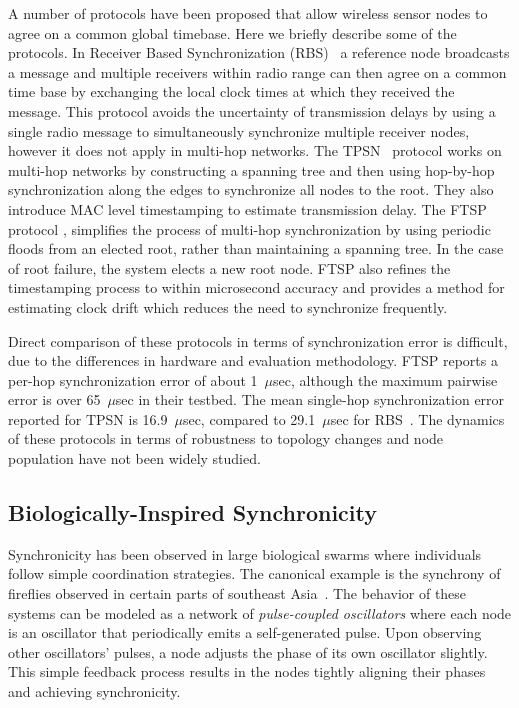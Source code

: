 
A number of protocols have been proposed that allow wireless sensor
nodes to agree on a common global timebase. Here we briefly describe
some of the protocols. In Receiver Based Synchronization
(RBS)~\cite{rbs} a reference node broadcasts a message and multiple
receivers within radio range can then agree on a common time base by
exchanging the local clock times at which they received the message.
This protocol avoids the uncertainty of transmission delays by using a
single radio message to simultaneously synchronize multiple receiver
nodes, however it does not apply in multi-hop networks. The
TPSN~\cite{tpsn} protocol works on multi-hop networks by constructing
a spanning tree and then using hop-by-hop synchronization along the
edges to synchronize all nodes to the root. They also introduce MAC
level timestamping to estimate transmission delay. The FTSP
protocol \cite{ftsp}, simplifies the process of multi-hop
synchronization by using periodic floods from an elected root, rather
than maintaining a spanning tree. In the case of root failure, the
system elects a new root node. FTSP also refines the timestamping
process to within microsecond accuracy and provides a method for
estimating clock drift which reduces the need to synchronize
frequently.

Direct comparison of these protocols in terms of synchronization error
is difficult, due to the differences in hardware and evaluation
methodology. FTSP reports a per-hop synchronization error of about
1~$\mu$sec, although the maximum pairwise error is over 65~$\mu$sec in
their testbed.  The mean single-hop synchronization error reported for
TPSN is 16.9~$\mu$sec, compared to 29.1~$\mu$sec for RBS~\cite{tpsn}.
The dynamics of these protocols in terms of robustness to topology
changes and node population have not been widely studied.

\subsection{Biologically-Inspired Synchronicity}

Synchronicity has been observed in large biological swarms where
individuals follow simple coordination strategies. The canonical
example is the synchrony of fireflies observed in certain parts of
southeast Asia~\cite{strogatz}.  The behavior of these systems can be
modeled as a network of {\em pulse-coupled oscillators} where each
node is an oscillator that periodically emits a self-generated pulse.
Upon observing other oscillators' pulses, a node adjusts the phase of
its own oscillator slightly. This simple feedback process results in
the nodes tightly aligning their phases and achieving synchronicity.

